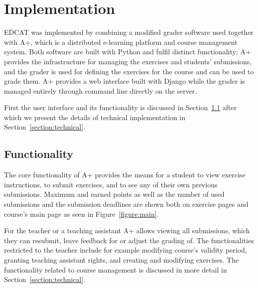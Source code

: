 \chapter{Implementation}
\label{chapter:implementation}

EDCAT was implemented by combining a modified grader software used together with A+, which is a distributed e-learning platform and course management system. Both software are built with Python and fulfil distinct functionality; A+ provides the infrastructure for managing the exercises and students' submissions, and the grader is used for defining the exercises for the course and can be used to grade them. A+ provides a web interface built with Django while the grader is managed entirely through command line directly on the server.

First the user interface and its functionality is discussed in Section~\ref{section:functionality} after which we present the details of technical implementation in Section~\ref{section:technical}.


\section{Functionality}
\label{section:functionality}

The core functionality of A+ provides the means for a student to view exercise instructions, to submit exercises, and to see any of their own previous submissions. Maximum and earned points as well as the number of used submissions and the submission deadlines are shown both on exercise pages and course's main page as seen in Figure~\ref{figure:main}.

For the teacher or a teaching assistant A+ allows viewing all submissions, which they can resubmit, leave feedback for or adjust the grading of. The functionalities restricted to the teacher include for example modifying course's validity period, granting teaching assistant rights, and creating and modifying exercises. The functionality related to course management is discussed in more detail in Section~\ref{section:technical}.


